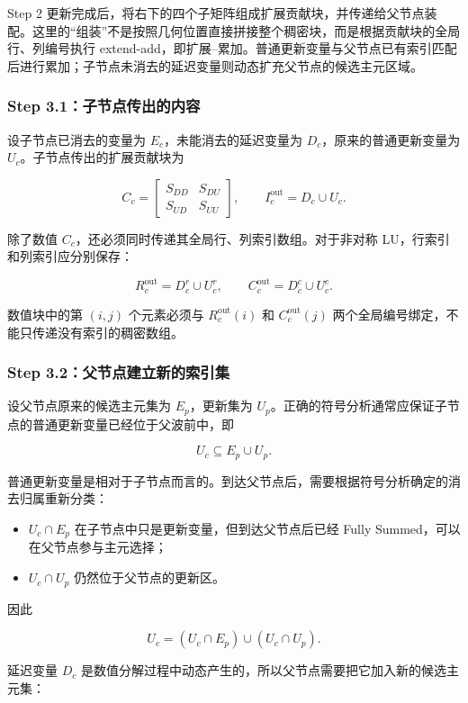 Step 2 更新完成后，将右下的四个子矩阵组成扩展贡献块，并传递给父节点装配。这里的“组装”不是按照几何位置直接拼接整个稠密块，而是根据贡献块的全局行、列编号执行 extend-add，即扩展--累加。普通更新变量与父节点已有索引匹配后进行累加；子节点未消去的延迟变量则动态扩充父节点的候选主元区域。

\subsubsection{Step 3.1：子节点传出的内容}

设子节点已消去的变量为 $E_c$，未能消去的延迟变量为 $D_c$，原来的普通更新变量为 $U_c$。子节点传出的扩展贡献块为

\[
C_c=
\begin{bmatrix}
S_{DD}&S_{DU}\\
S_{UD}&S_{UU}
\end{bmatrix},
\qquad
I_c^{\mathrm{out}}=D_c\cup U_c.
\]

除了数值 $C_c$，还必须同时传递其全局行、列索引数组。对于非对称 LU，行索引和列索引应分别保存：

\[
R_c^{\mathrm{out}}=D_c^r\cup U_c^r,
\qquad
C_c^{\mathrm{out}}=D_c^c\cup U_c^c.
\]

数值块中的第 $(i,j)$ 个元素必须与 $R_c^{\mathrm{out}}(i)$ 和 $C_c^{\mathrm{out}}(j)$ 两个全局编号绑定，不能只传递没有索引的稠密数组。

\subsubsection{Step 3.2：父节点建立新的索引集}

设父节点原来的候选主元集为 $E_p$，更新集为 $U_p$。正确的符号分析通常应保证子节点的普通更新变量已经位于父波前中，即

\[
U_c\subseteq E_p\cup U_p.
\]

普通更新变量是相对于子节点而言的。到达父节点后，需要根据符号分析确定的消去归属重新分类：

\begin{itemize}
  \item $U_c\cap E_p$ 在子节点中只是更新变量，但到达父节点后已经 Fully Summed，可以在父节点参与主元选择；
  \item $U_c\cap U_p$ 仍然位于父节点的更新区。
\end{itemize}

因此

\[
U_c=(U_c\cap E_p)\cup(U_c\cap U_p).
\]

延迟变量 $D_c$ 是数值分解过程中动态产生的，所以父节点需要把它加入新的候选主元集：


